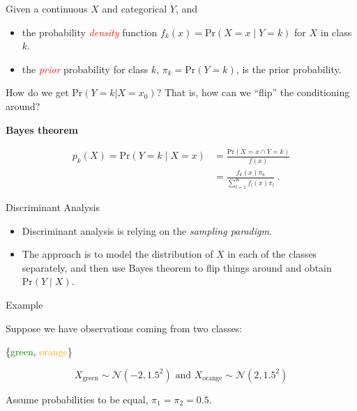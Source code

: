 \documentclass[10pt,ignorenonframetext,]{beamer}
\providecommand{\tightlist}{%
  \setlength{\itemsep}{0pt}\setlength{\parskip}{0pt}}
\begin{document}
\begin{frame}

Given a continuous \(X\) and categorical \(Y\), and

\begin{itemize}
\tightlist
\item
  the probability \emph{\textcolor{red}{density}} function
  \(f_k(x) = \text{Pr}(X=x \mid Y=k)\) for \(X\) in class \(k\).
\item
  the \emph{\textcolor{red}{prior}} probability for class \(k\),
  \(\pi_k = \text{Pr}(Y=k)\), is the prior probability.
\end{itemize}

How do we get \(\text{Pr}(Y=k | X=x_0)\)? That is, how can we ``flip''
the conditioning around? \vspace{4mm}

\begin{block}{\textbf{Bayes theorem}}

\vspace{-3mm}

\begin{align}
p_k(X) = \text{Pr}(Y=k \mid X= x) &= 
\frac{\text{Pr}(X=x \cap Y=k)}{f(x)} \nonumber\\
&= \frac{ f_k(x) \pi_k}{\sum_{l=1}^K  f_l(x) \pi_l}  \ . \label{eq:Bayes}
\end{align}

\end{block}

\end{frame}

\begin{frame}{Discriminant Analysis}
\protect\hypertarget{discriminant-analysis}{}

\vspace{2mm}

\begin{itemize}
\item
  Discriminant analysis is relying on the \emph{sampling paradigm}.
\item
  The approach is to model the distribution of \(X\) in each of the
  classes separately, and then use Bayes theorem to flip things around
  and obtain \(\text{Pr}(Y \mid X)\).
\end{itemize}

\vspace{2mm}

\begin{block}{Example}

\vspace{2mm}

Suppose we have observations coming from two classes:

\{\textcolor{green}{green}, \textcolor{orange}{orange}\}

\[X_{\text{green}}\sim \mathcal{N}(-2, 1.5^2) \text{ and }
X_{\text{orange}}\sim \mathcal{N}(2, 1.5^2) \]

\vspace{2mm}

Assume probabilities to be equal, \(\pi_1 = \pi_2 = 0.5\).

\end{block}

\end{frame}
\end{document}
